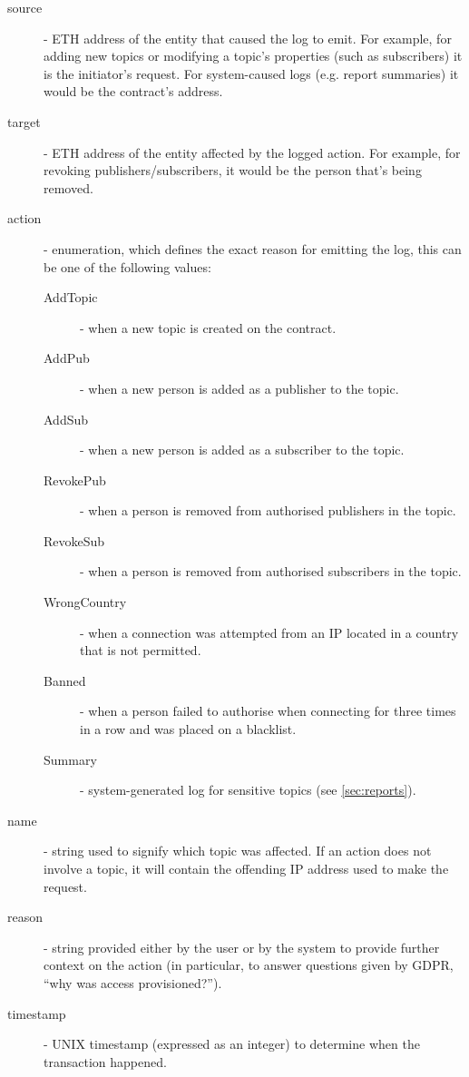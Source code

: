 \begin{description}
    \item[source] - ETH address of the entity that caused the log to emit. For example, for adding new topics or modifying a topic's properties (such as subscribers) it is the initiator's request. For system-caused logs (e.g. report summaries) it would be the contract's address.
    \item[target] - ETH address of the entity affected by the logged action. For example, for revoking publishers/subscribers, it would be the person that's being removed.
    \item[action] - enumeration, which defines the exact reason for emitting the log, this can be one of the following values:
    \begin{description}
        \item[AddTopic] - when a new topic is created on the contract.
        \item[AddPub] - when a new person is added as a publisher to the topic.
        \item[AddSub] - when a new person is added as a subscriber to the topic.
        \item[RevokePub] - when a person is removed from authorised publishers in the topic.
        \item[RevokeSub] - when a person is removed from authorised subscribers in the topic.
        \item[WrongCountry] - when a connection was attempted from an IP located in a country that is not permitted.
        \item[Banned] - when a person failed to authorise when connecting for three times in a row and was placed on a blacklist.
        \item[Summary] - system-generated log for sensitive topics (see \ref{sec:reports}).
    \end{description}
    \item[name] - string used to signify which topic was affected. If an action does not involve a topic, it will contain the offending IP address used to make the request.
    \item[reason] - string provided either by the user or by the system to provide further context on the action (in particular, to answer questions given by GDPR, ``why was access provisioned?'').
    \item[timestamp] - UNIX timestamp (expressed as an integer) to determine when the transaction happened.
\end{description}

